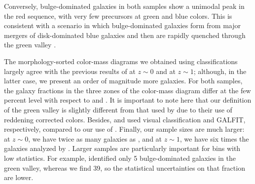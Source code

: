 Conversely, bulge-dominated galaxies in both samples show a unimodal peak in the red sequence, with very few precursors at green and blue colors. 
This is consistent with a scenario in which bulge-dominated galaxies form from major mergers of disk-dominated blue galaxies and then are rapidly quenched through the green valley \citep{Schawinski2014TheGalaxies}.

The morphology-sorted color-mass diagrams we obtained using \gamornet{} classifications largely agree with the previous results of \citet{Schawinski2014TheGalaxies} at $z\sim0$ and \citet{powell_17} at $z \sim 1$; although, in the latter case, we present an order of magnitude more galaxies. For both samples, the galaxy fractions in the three zones of the color-mass diagram differ at the few percent level with respect to \citet{Schawinski2014TheGalaxies} and \citet{powell_17}. It is important to note here that our definition of the green valley is slightly different from that used by \citet{Schawinski2014TheGalaxies} due to their use of reddening corrected colors. Besides, \cite{Schawinski2014TheGalaxies} and \cite{powell_17} used visual classification and GALFIT, respectively, compared to our use of \gamornet{}. Finally, our sample sizes are much larger: at $z \sim 0$, we have twice as many galaxies as \citet{Schawinski2014TheGalaxies}, and at $z\sim1$, we have six times the galaxies analyzed by \citet{powell_17}. Larger samples are particularly important for bins with low statistics. For example, \cite{powell_17} identified only 5 bulge-dominated galaxies in the green valley, whereas we find 39, so the statistical uncertainties on that fraction are lower.

